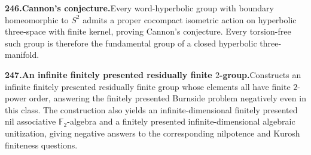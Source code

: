 \documentclass[11pt,a4paper]{article}
\begin{document}
  \par \begin{minipage}{\linewidth}
  \fontsize{10.5}{12.6}\selectfont\RaggedRight
  \hypertarget{result 246}{}
  {\bfseries\textcolor{muted}{246.}\enspace Cannon's conjecture.}\enspace Every word-hyperbolic group with boundary homeomorphic to $S^2$ admits a proper cocompact isometric action on hyperbolic three-space with finite kernel, proving Cannon's conjecture. Every torsion-free such group is therefore the fundamental group of a closed hyperbolic three-manifold.\par
  \end{minipage}\par\vspace{5pt}



  \par \begin{minipage}{\linewidth}
  \fontsize{10.5}{12.6}\selectfont\RaggedRight
  \hypertarget{result 247}{}
  {\bfseries\textcolor{muted}{247.}\enspace An infinite finitely presented residually finite $2$-group.}\enspace Constructs an infinite finitely presented residually finite group whose elements all have finite $2$-power order, answering the finitely presented Burnside problem negatively even in this class. The construction also yields an infinite-dimensional finitely presented nil associative $\mathbb F_2$-algebra and a finitely presented infinite-dimensional algebraic unitization, giving negative answers to the corresponding nilpotence and Kurosh finiteness questions.\par
  \end{minipage}\par\vspace{5pt}
\end{document}
